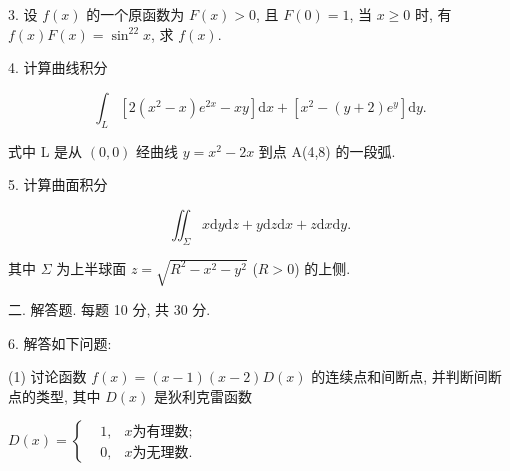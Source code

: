 \documentclass{examcollection}
\renewcommand{\displayformula}[1]{\[#1\]}
\begin{document}
{\begin{minipage}{\textwidth}
3. 设 $f(x)$ 的一个原函数为 $F(x) > 0$, 且 $F(0) = 1$, 当 $x \geq 0$ 时, 有 $f(x)F(x) = \sin^22x$, 求 $f(x)$.\par
4. 计算曲线积分\par
\displayformula{\int_ {L} [ 2 (x ^ {2} - x) e ^ {2 x} - x y ] \mathrm{d} x + [ x ^ {2} - (y + 2) e ^ {y} ] \mathrm{d} y.}\par
式中 L 是从  $(0,0)$  经曲线  $y = x^{2} - 2x$  到点 A(4,8) 的一段弧.\par
5. 计算曲面积分\par
\displayformula{\iint_ {\Sigma} x \mathrm{d} y \mathrm{d} z + y \mathrm{d} z \mathrm{d} x + z \mathrm{d} x \mathrm{d} y.}\par
其中 $\Sigma$ 为上半球面 $z = \sqrt{R^2 - x^2 - y^2}$ ($R > 0$) 的上侧.\par
二. 解答题. 每题 10 分, 共 30 分.\par
6. 解答如下问题:\par
(1) 讨论函数 $f(x) = (x - 1)(x - 2)D(x)$ 的连续点和间断点, 并判断间断点的类型, 其中 $D(x)$ 是狄利克雷函数\par
$D(x)=\left\{\begin{aligned}&1,&x \text{为有理数};\\ &0,&x \text{为无理数}.\end{aligned}\right.$\par
\end{minipage}}
\ifdim\dimexpr\ht\proofbox+\dp\proofbox\relax>\textheight
\noindent\resizebox{!}{\textheight}{\usebox{\proofbox}}\else\noindent\usebox{\proofbox}\fi\clearpage
\end{document}
